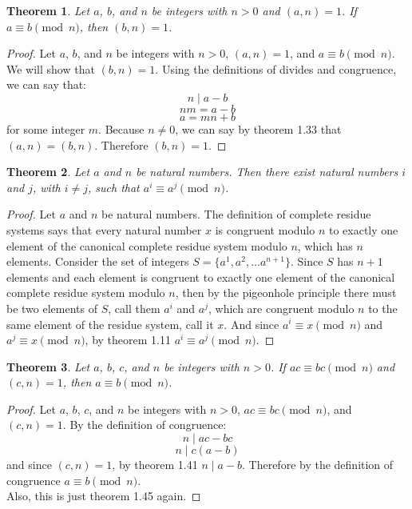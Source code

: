 \documentclass[12pt,leqno]{article}
\numberwithin{equation}{section}
\newtheorem{thm}{Theorem}[section]
\theoremstyle{definition}
\begin{document}
\pagebreak

\begin{thm}
Let $a$, $b$, and $n$ be integers with $n>0$ and $(a, n) = 1$.  If
$a\equiv b \pmod{n}$, then $(b, n) = 1$.
\end{thm}
\begin{proof}[Proof]
Let $a$, $b$, and $n$ be integers with $n>0$, $(a, n) = 1$, and $a\equiv b \pmod{n}$. We will show that $(b, n) = 1$.
Using the definitions of divides and congruence, we can say that:
\[n \mid a - b\]
\[nm = a - b\]
\[a = mn + b\]
for some integer $m$.  Because $n \neq 0$, we can say by theorem 1.33 that $(a, n) = (b, n)$.  Therefore $(b, n) = 1$.
\end{proof}


\begin{thm}
Let $a$ and $n$ be natural numbers.  Then there exist natural
numbers $i$ and $j$, with $i \neq j$, such that $a^i \equiv a^j
\pmod{n}$.
\end{thm}
\begin{proof}[Proof]
Let $a$ and $n$ be natural numbers.  The definition of complete residue systems says that every natural number $x$ is 
congruent modulo $n$ to exactly one element of the canonical complete residue system modulo $n$, which has $n$ elements.
Consider the set of integers $S = \{a^1, a^2, \dots a^{n+1}\}$.  Since $S$ has $n+1$ elements and each element is congruent to
exactly one element of the canonical complete residue system modulo $n$, then by the pigeonhole principle there must be two elements of $S$,
call them $a^i$ and $a^j$, which are congruent modulo $n$ to the same element of the residue system, call it $x$.  And since $a^i \equiv x \pmod{n}$
and $a^j \equiv x \pmod{n}$, by theorem 1.11 $a^i \equiv a^j \pmod{n}$.
\end{proof}


\begin{thm}
Let $a$, $b$, $c$, and $n$ be integers with $n
> 0$.  If $ac \equiv bc \pmod{n}$ and $(c, n) = 1$, then $a \equiv b
\pmod{n}$.
\end{thm}
\begin{proof}[Proof]
Let $a$, $b$, $c$, and $n$ be integers with $n > 0$,  $ac \equiv bc \pmod{n}$, and $(c, n) = 1$.
By the definition of congruence:
\[n \mid ac - bc\]
\[n \mid c(a - b)\]
and since $(c, n) = 1$, by theorem 1.41 $n \mid a - b$.  Therefore by the definition of congruence $a \equiv b \pmod{n}$.\\

Also, this is just theorem 1.45 again.
\end{proof}
\end{document}
